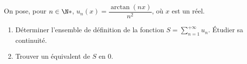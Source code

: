 \begin{enonce}
\begin{exercise}[ID={RMS127 E736},subtitle={Mines-Ponts PSI 2016},tags={}]
  On pose, pour $n\in\N*$, $u_n(x)=\dfrac{\arctan(nx)}{n^2}$, où $x$ est un réel.
  \begin{enumerate}
    \item 
      Déterminer l'ensemble de définition de la fonction $S=\sum\limits_{n=1}^{+\infty} u_n$.
      Étudier sa continuité.

    \item
      Trouver un équivalent de $S$ en $0$.
  \end{enumerate}
\end{exercise}
\begin{solution}
\end{solution}
\end{enonce}

